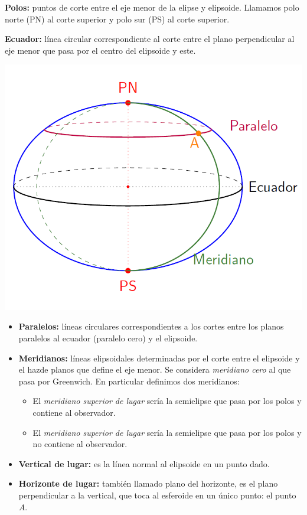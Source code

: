 \begin{itemize}
	\begin{minipage}{.45\textwidth}
		\item   \textbf{Polos:} puntos de corte entre el eje menor de la elipse y elipsoide. Llamamos polo norte (PN) al corte superior y polo sur (PS) al corte superior.
		\item \textbf{Ecuador:} línea circular correspondiente al corte entre el plano perpendicular al eje menor que pasa por el centro del elipsoide y este.
	\end{minipage}	\hfill
	\begin{minipage}{0.45\textwidth} \centering
		\includegraphics[scale=0.37]{Cuerpo/Imagenes/01_Elipsoide.png}
	\end{minipage}
\end{itemize}
\begin{itemize}
	\item \textbf{Paralelos:} líneas circulares correspondientes a los cortes entre los planos paralelos al ecuador (paralelo cero) y el elipsoide.
	\item \textbf{Meridianos:} líneas elipsoidales determinadas por el corte entre el elipsoide y el hazde planos que define el eje menor. Se considera \textit{meridiano cero} al que pasa por Greenwich. En particular definimos dos meridianos: 
	\begin{itemize}
		\item El \textit{meridiano superior de lugar} sería la semielipse que pasa por los polos y contiene al observador.
		\item El \textit{meridiano superior de lugar} sería la semielipse que pasa por los polos y  no contiene al observador.
	\end{itemize}
	\item \textbf{Vertical de lugar:} es la línea normal al elipsoide en un punto dado.
	\item \textbf{Horizonte de lugar:} también llamado plano del horizonte, es el plano perpendicular  a la vertical, que toca al esferoide en un único punto: el punto $A$. 
\end{itemize}



